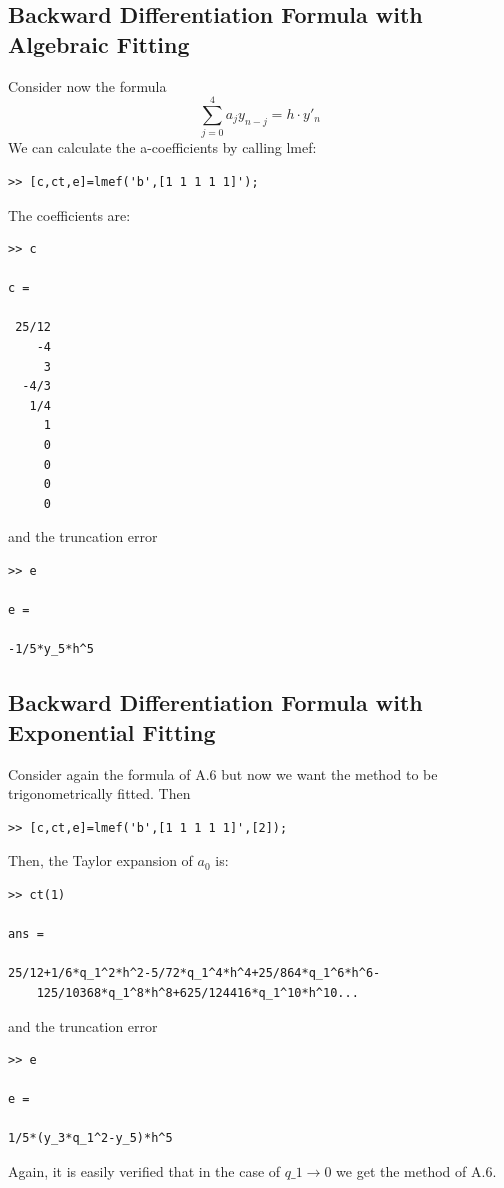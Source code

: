 \documentclass[acmtoms,acmnow]{acmtrans2m}
\begin{document}
\subsection{Backward Differentiation Formula with Algebraic Fitting}
Consider now the formula
\begin{equation}
\sum_{j=0}^{4}a_jy_{n-j}=h\cdot y'_n
\end{equation}
We can calculate the a-coefficients by calling lmef:
\begin{verbatim}
>> [c,ct,e]=lmef('b',[1 1 1 1 1]');
\end{verbatim}
The coefficients are:
\begin{verbatim}
>> c

c =

 25/12
    -4
     3
  -4/3
   1/4
     1
     0
     0
     0
     0
\end{verbatim}
and the truncation error
\begin{verbatim}
>> e

e =

-1/5*y_5*h^5
\end{verbatim}

\subsection{Backward Differentiation Formula with Exponential Fitting}
Consider again the formula of A.6 but now we want the method
to be trigonometrically fitted. Then
\begin{verbatim}
>> [c,ct,e]=lmef('b',[1 1 1 1 1]',[2]);
\end{verbatim}
Then, the Taylor expansion of $a_0$ is:
\begin{verbatim}
>> ct(1)

ans =

25/12+1/6*q_1^2*h^2-5/72*q_1^4*h^4+25/864*q_1^6*h^6-
    125/10368*q_1^8*h^8+625/124416*q_1^10*h^10...
\end{verbatim}
and the truncation error
\begin{verbatim}
>> e

e =

1/5*(y_3*q_1^2-y_5)*h^5
\end{verbatim}
Again, it is easily verified that in the case of $q\_1\rightarrow 0$
we get the method of A.6.
\end{document}
